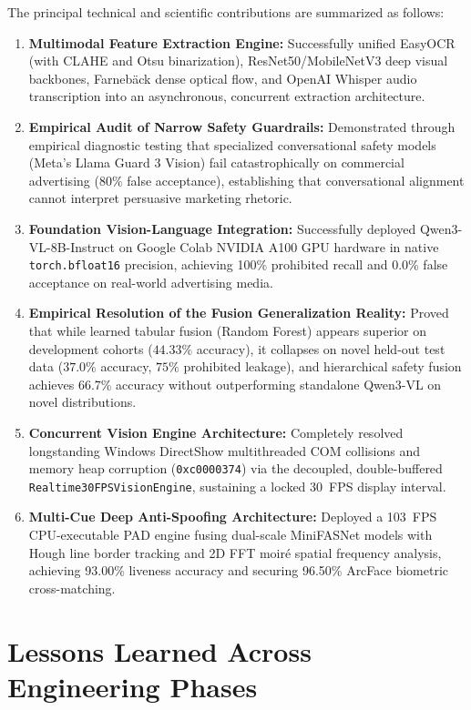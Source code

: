 \documentclass[12pt,a4paper]{report}
\begin{document}
The principal technical and scientific contributions are summarized as follows:
\begin{enumerate}
    \item \textbf{Multimodal Feature Extraction Engine:} Successfully unified EasyOCR (with CLAHE and Otsu binarization), ResNet50/MobileNetV3 deep visual backbones, Farneb\"{a}ck dense optical flow, and OpenAI Whisper audio transcription into an asynchronous, concurrent extraction architecture.
    \item \textbf{Empirical Audit of Narrow Safety Guardrails:} Demonstrated through empirical diagnostic testing that specialized conversational safety models (Meta's Llama Guard 3 Vision) fail catastrophically on commercial advertising ($80\%$ false acceptance), establishing that conversational alignment cannot interpret persuasive marketing rhetoric.
    \item \textbf{Foundation Vision-Language Integration:} Successfully deployed Qwen3-VL-8B-Instruct on Google Colab NVIDIA A100 GPU hardware in native \texttt{torch.bfloat16} precision, achieving 100\% prohibited recall and 0.0\% false acceptance on real-world advertising media.
    \item \textbf{Empirical Resolution of the Fusion Generalization Reality:} Proved that while learned tabular fusion (Random Forest) appears superior on development cohorts ($44.33\%$ accuracy), it collapses on novel held-out test data ($37.0\%$ accuracy, $75\%$ prohibited leakage), and hierarchical safety fusion achieves 66.7\% accuracy without outperforming standalone Qwen3-VL on novel distributions.
    \item \textbf{Concurrent Vision Engine Architecture:} Completely resolved longstanding Windows DirectShow multithreaded COM collisions and memory heap corruption (\texttt{0xc0000374}) via the decoupled, double-buffered \texttt{Realtime30FPSVisionEngine}, sustaining a locked 30~FPS display interval.
    \item \textbf{Multi-Cue Deep Anti-Spoofing Architecture:} Deployed a 103~FPS CPU-executable PAD engine fusing dual-scale MiniFASNet models with Hough line border tracking and 2D FFT moir\'{e} spatial frequency analysis, achieving 93.00\% liveness accuracy and securing 96.50\% ArcFace biometric cross-matching.
\end{enumerate}

\section{Lessons Learned Across Engineering Phases}
\end{document}
